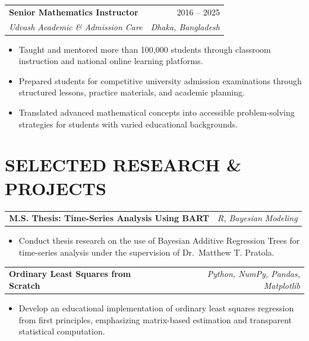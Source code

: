 \documentclass[10pt,letterpaper]{article}
\makeatletter
\newcommand{\resumeEntry}[4]{%
  \begin{tabularx}{\textwidth}{@{}Xr@{}}
    \textbf{#1} & #2 \\
    \textit{#3} & \textit{#4}
  \end{tabularx}%
}
\newcommand{\projectEntry}[2]{%
  \begin{tabularx}{\textwidth}{@{}Xr@{}}
    \textbf{#1} & \textit{#2}
  \end{tabularx}%
}
\newenvironment{resumeItems}{%
  \begin{itemize}[
    label=\textbullet,
    leftmargin=14pt,
    labelsep=5pt,
    itemsep=0.5pt,
    topsep=1.0pt,
    parsep=0pt,
    partopsep=0pt
  ]
}{%
  \end{itemize}
}
\makeatother
\begin{document}
\vspace{1.3pt}

\resumeEntry
  {Senior Mathematics Instructor}
  {2016 -- 2025}
  {Udvash Academic \& Admission Care}
  {Dhaka, Bangladesh}

\begin{resumeItems}
  \item Taught and mentored more than 100,000 students through
  classroom instruction and national online learning platforms.

  \item Prepared students for competitive university admission
  examinations through structured lessons, practice materials,
  and academic planning.

  \item Translated advanced mathematical concepts into accessible
  problem-solving strategies for students with varied educational
  backgrounds.
\end{resumeItems}

\section*{SELECTED RESEARCH \& PROJECTS}

\projectEntry
  {M.S. Thesis: Time-Series Analysis Using BART}
  {R, Bayesian Modeling}

\begin{resumeItems}
  \item Conduct thesis research on the use of Bayesian Additive
  Regression Trees for time-series analysis under the supervision
  of Dr.\ Matthew T. Pratola.
\end{resumeItems}

\vspace{0.7pt}

\projectEntry
  {Ordinary Least Squares from Scratch}
  {Python, NumPy, Pandas, Matplotlib}

\begin{resumeItems}
  \item Develop an educational implementation of ordinary least
  squares regression from first principles, emphasizing
  matrix-based estimation and transparent statistical computation.
\end{resumeItems}

\end{document}
